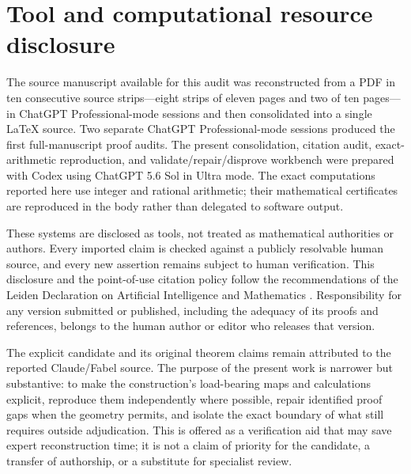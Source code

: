 \section{Tool and computational resource disclosure}

The source manuscript available for this audit was reconstructed from a PDF
in ten consecutive source strips---eight strips of eleven pages and two of
ten pages---in ChatGPT Professional-mode sessions and then consolidated into
a single \LaTeX{} source.  Two separate ChatGPT
Professional-mode sessions produced the first full-manuscript proof audits.
The present consolidation, citation audit, exact-arithmetic reproduction, and
validate/repair/disprove workbench were prepared with Codex using ChatGPT
5.6 Sol in Ultra mode.  The exact computations reported here use integer and
rational arithmetic; their mathematical certificates are reproduced in the
body rather than delegated to software output.

These systems are disclosed as tools, not treated as mathematical
authorities or authors.  Every imported claim is checked against a publicly
resolvable human source, and every new assertion remains subject to human
verification.  This disclosure and the point-of-use citation policy follow
the recommendations of the Leiden Declaration on Artificial Intelligence and
Mathematics \cite{Leiden2026}.  Responsibility for any version submitted or
published, including the adequacy of its proofs and references, belongs to
the human author or editor who releases that version.

The explicit candidate and its original theorem claims remain attributed to
the reported Claude/Fabel source.  The purpose of the present work is narrower
but substantive: to make the construction's load-bearing maps and calculations
explicit, reproduce them independently where possible, repair identified proof
gaps when the geometry permits, and isolate the exact boundary of what still
requires outside adjudication.  This is offered as a verification aid that may
save expert reconstruction time; it is not a claim of priority for the
candidate, a transfer of authorship, or a substitute for specialist review.
